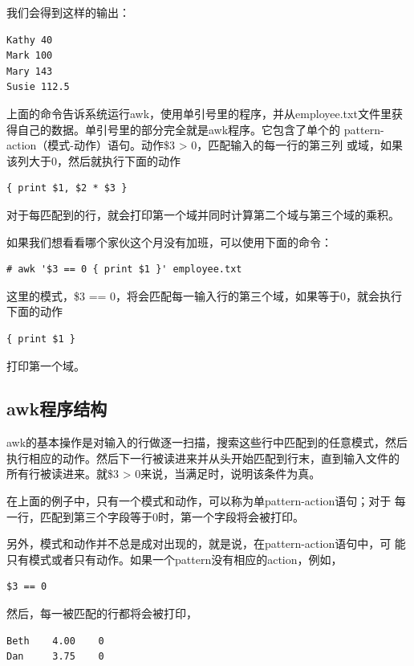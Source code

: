 我们会得到这样的输出：

\begin{verbatim}
Kathy 40
Mark 100
Mary 143
Susie 112.5
\end{verbatim}

上面的命令告诉系统运行awk，使用单引号里的程序，并从employee.txt文件里获
得自己的数据。单引号里的部分完全就是awk程序。它包含了单个的
pattern-action（模式-动作）语句。动作\$3 >  0，匹配输入的每一行的第三列
或域，如果该列大于0，然后就执行下面的动作

\begin{verbatim}
{ print $1, $2 * $3 }
\end{verbatim}

对于每匹配到的行，就会打印第一个域并同时计算第二个域与第三个域的乘积。

如果我们想看看哪个家伙这个月没有加班，可以使用下面的命令：

\begin{verbatim}
# awk '$3 == 0 { print $1 }' employee.txt
\end{verbatim}

这里的模式，\$3 == 0，将会匹配每一输入行的第三个域，如果等于0，就会执行
下面的动作

\begin{verbatim}
{ print $1 }
\end{verbatim}

打印第一个域。

\subsection{awk程序结构}

awk的基本操作是对输入的行做逐一扫描，搜索这些行中匹配到的任意模式，然后
执行相应的动作。然后下一行被读进来并从头开始匹配到行末，直到输入文件的
所有行被读进来。就\$3 > 0来说，当满足时，说明该条件为真。

在上面的例子中，只有一个模式和动作，可以称为单pattern-action语句；对于
每一行，匹配到第三个字段等于0时，第一个字段将会被打印。

另外，模式和动作并不总是成对出现的，就是说，在pattern-action语句中，可
能只有模式或者只有动作。如果一个pattern没有相应的action，例如，

\begin{verbatim}
$3 == 0
\end{verbatim}

然后，每一被匹配的行都将会被打印，

\begin{verbatim}
Beth    4.00    0
Dan     3.75    0
\end{verbatim}


